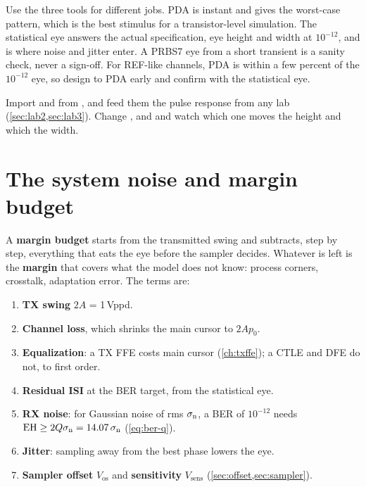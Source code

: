 \begin{insight}
Use the three tools for different jobs. PDA is instant and gives the worst-case pattern, which is the best stimulus for a transistor-level simulation. The statistical eye answers the actual specification, eye height and width at $10^{-12}$, and is where noise and jitter enter. A PRBS7 eye from a short transient is a sanity check, never a sign-off. For REF-like channels, PDA is within a few percent of the $10^{-12}$ eye, so design to PDA early and confirm with the statistical eye.
\end{insight}

\begin{tryit}
Import  and  from , and feed them the pulse response from any lab (\cref{sec:lab2,sec:lab3}). Change ,  and  and watch which one moves the height and which the width.
\end{tryit}

\section{The system noise and margin budget}\label{sec:noisebudget}

A \textbf{margin budget} starts from the transmitted swing and subtracts, step by step, everything that eats the eye before the sampler decides. Whatever is left is the \textbf{margin} that covers what the model does not know: process corners, crosstalk, adaptation error. The terms are:
\begin{enumerate}[label=(\roman*)]
  \item \textbf{TX swing} $2A$ = 1\,Vppd.
  \item \textbf{Channel loss}, which shrinks the main cursor to $2A p_0$.
  \item \textbf{Equalization}: a TX FFE costs main cursor (\cref{ch:txffe}); a CTLE and DFE do not, to first order.
  \item \textbf{Residual ISI} at the BER target, from the statistical eye.
  \item \textbf{RX noise}: for Gaussian noise of rms $\sigma_\mathrm{n}$, a BER of $10^{-12}$ needs $\mathrm{EH} \ge 2Q\sigma_\mathrm{n} = 14.07\,\sigma_\mathrm{n}$ (\cref{eq:ber-q}).
  \item \textbf{Jitter}: sampling away from the best phase lowers the eye.
  \item \textbf{Sampler offset} $V_\mathrm{os}$ and \textbf{sensitivity} $V_\mathrm{sens}$ (\cref{sec:offset,sec:sampler}).
\end{enumerate}

